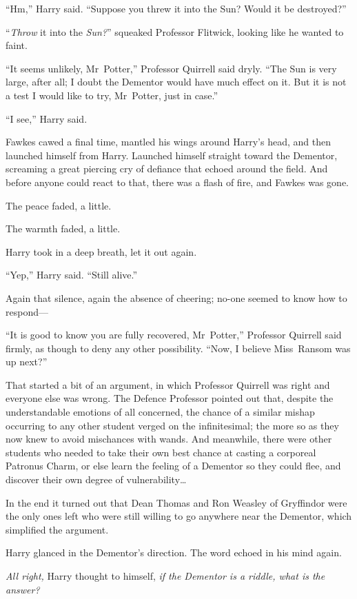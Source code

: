 “Hm,” Harry said. “Suppose you threw it into the Sun? Would it be destroyed?”

“\emph{Throw} it into the \emph{Sun?}” squeaked Professor Flitwick, looking like he wanted to faint.

“It seems unlikely, Mr~Potter,” Professor Quirrell said dryly. “The Sun is very large, after all; I doubt the Dementor would have much effect on it. But it is not a test I would like to try, Mr~Potter, just in case.”

“I see,” Harry said.

Fawkes cawed a final time, mantled his wings around Harry’s head, and then launched himself from Harry. Launched himself straight toward the Dementor, screaming a great piercing cry of defiance that echoed around the field. And before anyone could react to that, there was a flash of fire, and Fawkes was gone.

The peace faded, a little.

The warmth faded, a little.

Harry took in a deep breath, let it out again.

“Yep,” Harry said. “Still alive.”

Again that silence, again the absence of cheering; no-one seemed to know how to respond—

“It is good to know you are fully recovered, Mr~Potter,” Professor Quirrell said firmly, as though to deny any other possibility. “Now, I believe Miss~Ransom was up next?”

That started a bit of an argument, in which Professor Quirrell was right and everyone else was wrong. The Defence Professor pointed out that, despite the understandable emotions of all concerned, the chance of a similar mishap occurring to any other student verged on the infinitesimal; the more so as they now knew to avoid mischances with wands. And meanwhile, there were other students who needed to take their own best chance at casting a corporeal Patronus Charm, or else learn the feeling of a Dementor so they could flee, and discover their own degree of vulnerability…

In the end it turned out that Dean Thomas and Ron Weasley of Gryffindor were the only ones left who were still willing to go anywhere near the Dementor, which simplified the argument.

Harry glanced in the Dementor’s direction. The word echoed in his mind again.

\emph{All right,} Harry thought to himself, \emph{if the Dementor is a riddle, what is the answer?}

